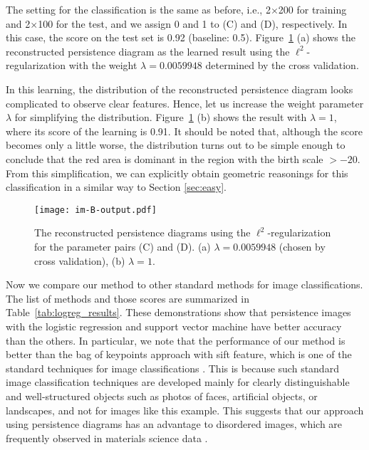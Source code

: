 \documentclass[smallextended]{svjour3}
\begin{document}
The setting for the classification is the same as before, i.e., 2$\times$200 for training and 2$\times$100 for the test, and we assign 0 and 1 to (C) and (D), respectively. In this case, the score on the test set is 0.92 (baseline: 0.5). Figure~\ref{fig:output_im_B} (a) shows the reconstructed persistence diagram as the learned result using the $\ell^2$-regularization with the weight $\lambda = 0.0059948$ determined by the cross validation. 

In this learning, the distribution of the reconstructed persistence diagram looks complicated to observe clear features. Hence, let us increase  the weight parameter $\lambda$  for simplifying the distribution. 
Figure~\ref{fig:output_im_B} (b) shows the result with $\lambda=1$, where its score of the learning is 0.91. It should be noted that, although the score becomes only a little worse, the distribution turns out to be simple enough to conclude that the red area is dominant in the region with the birth scale $>-20$. From this simplification, we can explicitly obtain geometric reasonings for this classification in a similar way to Section \ref{sec:easy}.
 

\begin{figure}[htbp]
  \centering
  \texttt{[image: im-B-output.pdf]}
  \caption{The reconstructed persistence diagrams using the $\ell^2$-regularization for the parameter pairs (C) and (D). (a) $\lambda = 0.0059948$ (chosen by cross validation), (b) $\lambda=1$.
  }
  \label{fig:output_im_B}
\end{figure}

Now we compare our method to other standard methods for image classifications. The list of methods and those scores are summarized in Table~\ref{tab:logreg_results}. These demonstrations show that persistence images with the logistic regression and support vector machine have better accuracy than the others. In particular, we note that the performance of our method is better than the bag of keypoints approach with sift feature, which is one of the standard techniques for image classifications \citep{sift,bow,bow-classification,bow-strategy}.
This is because such standard image classification techniques are developed mainly for clearly distinguishable and well-structured objects such as photos of faces, artificial objects, or landscapes, and not for images like this example. This suggests that our approach using persistence diagrams has an advantage to disordered images, which are frequently observed in materials science data \citep{iron}.
\end{document}

